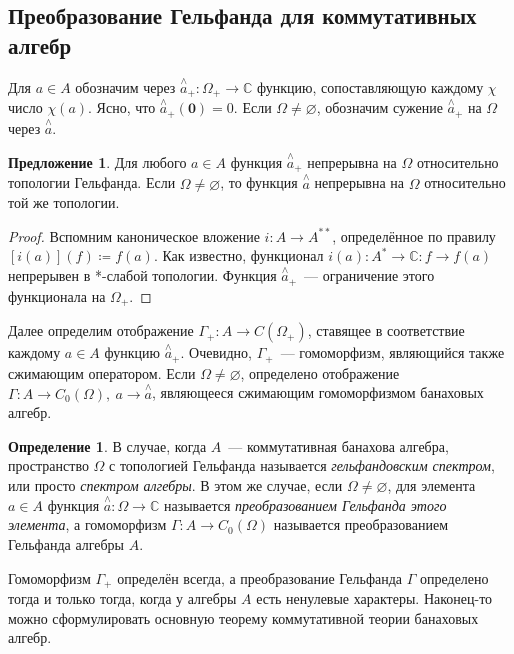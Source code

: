 \documentclass[12pt]{extarticle}
\theoremstyle{definition}
\newtheorem{definition}{\indent Определение}[section]
\newtheorem{suggestion}{\indent Предложение}[section]
\begin{document}
    \subsection{Преобразование Гельфанда для коммутативных алгебр}

    Для $a \in A$ обозначим через $\stackrel{\wedge}{a}_+: \Omega_+ \rightarrow \mathds{C}$ функцию, сопоставляющую каждому $\chi$ число $\chi(a)$. Ясно, что $\stackrel{\wedge}{a}_+(\mathbf{0}) = 0$. Если $\Omega \neq \varnothing$, обозначим сужение $\stackrel{\wedge}{a}_+$ на $\Omega$ через $\stackrel{\wedge}{a}$.

    \begin{suggestion}
    Для любого $a \in A$ функция $\stackrel{\wedge}{a}_+$ непрерывна на $\Omega$ относительно топологии Гельфанда. Если $\Omega \neq \varnothing$, то функция  $\stackrel{\wedge}{a}$ непрерывна на $\Omega$ относительно той же топологии.
    \end{suggestion}
    \begin{proof}
    Вспомним каноническое вложение $i: A \rightarrow A^{**}$, определённое по правилу $[i(a)](f)\coloneq f(a)$. Как известно, функционал $i(a): A^{*} \rightarrow \mathds{C}: f \rightarrow f(a)$ непрерывен в *-слабой топологии. Функция $\stackrel{\wedge}{a}_+$~--- ограничение этого функционала на $\Omega_+$.
    \end{proof}

    Далее определим отображение $\Gamma_+: A \rightarrow C(\Omega_+)$, ставящее в соответствие каждому $a \in A$ функцию $\stackrel{\wedge}{a}_+$. Очевидно, $\Gamma_+$~--- гомоморфизм, являющийся также сжимающим оператором. Если $\Omega \neq \varnothing$, определено отображение  $\Gamma: A \rightarrow C_0(\Omega),\ a \rightarrow \stackrel{\wedge}{a}$, являющееся сжимающим гомоморфизмом банаховых алгебр.

    \begin{definition}
    В случае, когда $A$~--- коммутативная банахова алгебра, пространство $\Omega$ с топологией Гельфанда называется \textit{гельфандовским спектром}, или просто \textit{спектром алгебры}. В этом же случае, если $\Omega \neq \varnothing$, для элемента $a \in A$ функция $\stackrel{\wedge}{a}: \Omega \rightarrow \mathds{C}$ называется \textit{преобразованием Гельфанда этого элемента}, а гомоморфизм $\Gamma: A \rightarrow C_0(\Omega)$ называется преобразованием Гельфанда алгебры $A$.
    \end{definition}

    Гомоморфизм $\Gamma_+$ определён всегда, а преобразование Гельфанда $\Gamma$ определено тогда и только тогда, когда у алгебры $A$ есть ненулевые характеры. Наконец-то можно сформулировать основную теорему коммутативной теории банаховых алгебр.
\end{document}
